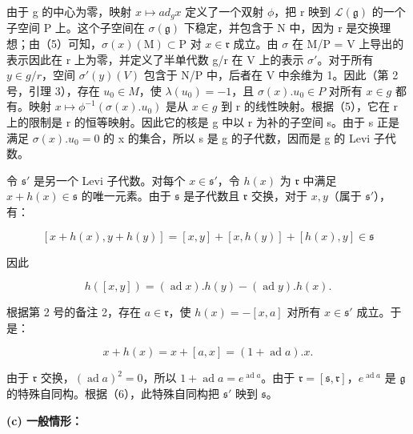 由于 g 的中心为零，映射 \(x \mapsto ad_{g}x\) 定义了一个双射 \(\phi\)，把 r 映到 \(\mathcal{L}(\mathfrak{g})\) 的一个子空间 P 上。这个子空间在 \(\sigma(\mathfrak{g})\) 下稳定，并包含于 N 中，因为 r 是交换理想；由（5）可知，\(\sigma(x)(\mathrm{M}) \subset \mathrm{P}\) 对 \(x \in \mathfrak{r}\) 成立。由 \(\sigma\) 在 M/P = V 上导出的表示因此在 r 上为零，并定义了半单代数 g/r 在 V 上的表示 \(\sigma'\)。对于所有 \(y \in g/r\)，空间 \(\sigma'(y)(V)\) 包含于 N/P 中，后者在 V 中余维为 1。因此（第 2 号，引理 3），存在 \(u_{0} \in M\)，使 \(\lambda(u_{0}) = -1\)，且 \(\sigma(x).u_{0} \in P\) 对所有 \(x \in g\) 都有。映射 \(x \mapsto \phi^{-1}(\sigma(x).u_{0})\) 是从 \(x \in g\) 到 r 的线性映射。根据（5），它在 r 上的限制是 r 的恒等映射。因此它的核是 g 中以 r 为补的子空间 s。由于 s 正是满足 \(\sigma(x).u_{0} = 0\) 的 x 的集合，所以 s 是 g 的子代数，因而是 g 的 Levi 子代数。

令 \(\mathfrak{s}'\) 是另一个 Levi 子代数。对每个 \(x \in \mathfrak{s}'\)，令 \(h(x)\) 为 \(\mathfrak{r}\) 中满足 \(x + h(x) \in \mathfrak{s}\) 的唯一元素。由于 \(\mathfrak{s}\) 是子代数且 \(\mathfrak{r}\) 交换，对于 \(x, y\)（属于 \(\mathfrak{s}'\)），有：

\[
[ x + h (x), y + h (y) ] = [ x, y ] + [ x, h (y) ] + [ h (x), y ] \in \mathfrak {s}
\]

因此

\[
h ([ x, y ]) = (\operatorname{ad} x). h (y) - (\operatorname{ad} y). h (x).
\]

根据第 2 号的备注 2，存在 \(a \in \mathfrak{r}\)，使 \(h(x) = -[x, a]\) 对所有 \(x \in \mathfrak{s}'\) 成立。于是：

\[
x + h (x) = x + [ a, x ] = (1 + \operatorname{ad} a). x.\tag{6}
\]

由于 \(\mathfrak{r}\) 交换，\((\operatorname{ad} a)^2 = 0\)，所以 \(1 + \operatorname{ad} a = e^{\operatorname{ad} a}\)。由于 \(\mathfrak{r} = [\mathfrak{s}, \mathfrak{r}]\)，\(e^{\operatorname{ad} a}\) 是 \(\mathfrak{g}\) 的特殊自同构。根据（6），此特殊自同构把 \(\mathfrak{s}'\) 映到 \(\mathfrak{s}\)。

\textbf{(c) 一般情形：}

